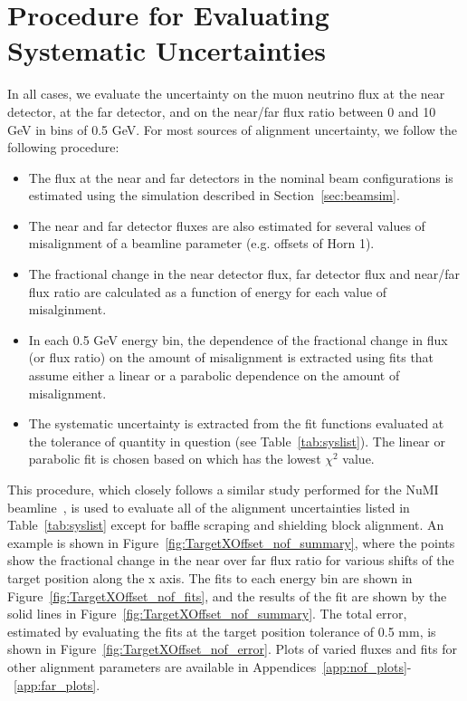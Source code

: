 \section{Procedure for Evaluating Systematic Uncertainties}
\label{sec:procedure}

In all cases, we evaluate the uncertainty on the muon neutrino flux at the near detector, at the far detector, and on the near/far flux ratio between 0 and 10 GeV in bins of 0.5 GeV.  For most sources of alignment uncertainty, we follow the following procedure:

\begin{itemize}
\item The flux at the near and far detectors in the nominal beam configurations is estimated using the simulation described in Section~\ref{sec:beamsim}.
\item The near and far detector fluxes are also estimated for several values of misalignment of a beamline parameter (e.g. offsets of Horn 1).  
\item The fractional change in the near detector flux, far detector flux and near/far flux ratio are calculated as a function of energy for each value of misalginment.  
\item In each 0.5 GeV energy bin,  the dependence of the fractional change in flux (or flux ratio) on the amount of misalignment is extracted using fits that assume either a linear or a parabolic dependence on the amount of misalignment. 
\item The systematic uncertainty is extracted from the fit functions evaluated at the tolerance of quantity in question (see Table~\ref{tab:syslist}).  The linear or parabolic fit is chosen based on which has the lowest $\chi^2$ value.
\end{itemize}

This procedure, which closely follows a similar study performed for the NuMI beamline~\cite{numitdh}, is used to evaluate all of the alignment uncertainties listed in Table~\ref{tab:syslist} except for baffle scraping and shielding block alignment. An example is shown in Figure~\ref{fig:TargetXOffset_nof_summary}, where the points show the fractional change in the near over far flux ratio for various shifts of the target position along the x axis.  The fits to each energy bin are shown in Figure~\ref{fig:TargetXOffset_nof_fits}, and the results of the fit are shown by the solid lines in Figure~\ref{fig:TargetXOffset_nof_summary}.  The total error, estimated by evaluating the fits at the target position tolerance of 0.5 mm, is shown in Figure~\ref{fig:TargetXOffset_nof_error}.  Plots of varied fluxes and fits for other alignment parameters are available in Appendices~\ref{app:nof_plots}-~\ref{app:far_plots}.

